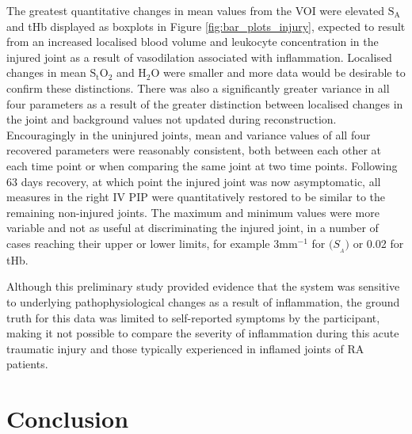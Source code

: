 \documentclass[twoside]{bhamthesis}
\theoremstyle{definition}
\begin{document}
The greatest quantitative changes in mean values from the VOI were elevated $\mathrm{S_A}$ and tHb displayed as boxplots in Figure \ref{fig:bar_plots_injury}, expected to result from an increased localised blood volume and leukocyte concentration in the injured joint as a result of vasodilation associated with inflammation. Localised changes in mean $\mathrm{S_tO_2}$ and $\mathrm{H_2O}$ were smaller and more data would be desirable to confirm these distinctions. There was also a significantly greater variance in all four parameters as a result of the greater distinction between localised changes in the joint and background values not updated during reconstruction. Encouragingly in the uninjured joints, mean and variance values of all four recovered parameters were reasonably consistent, both between each other at each time point or when comparing the same joint at two time points. Following 63 days recovery, at which point the injured joint was now asymptomatic, all measures in the right IV PIP were quantitatively restored to be similar to the remaining non-injured joints. The maximum and minimum values were more variable and not as useful at discriminating the injured joint, in a number of cases reaching their upper or lower limits, for example 3mm$^{-1}$ for $\mathrm(S_{_A})$ or 0.02 for tHb.
 
Although this preliminary study provided evidence that the system was sensitive to underlying pathophysiological changes as a result of inflammation, the ground truth for this data was limited to self-reported symptoms by the participant, making it not possible to compare the severity of inflammation during this acute traumatic injury and those typically experienced in inflamed joints of RA patients.

\section{Conclusion}
\end{document}
